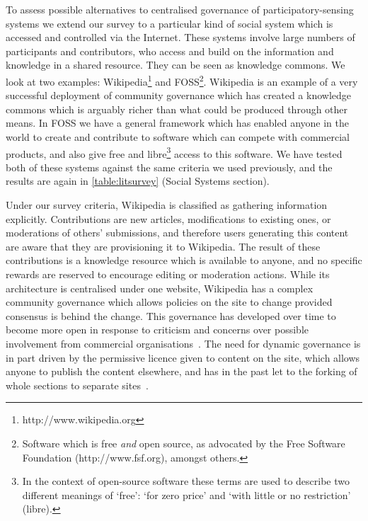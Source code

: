 To assess possible alternatives to centralised governance of participatory-sensing systems we extend our survey to a particular kind of social system which is accessed and controlled via the Internet. 
These systems involve large numbers of participants and contributors, who access and build on the information and knowledge in a shared resource. They can be seen as knowledge commons. We look at two examples: Wikipedia\footnote{http://www.wikipedia.org} and \ac{FOSS}\footnote{Software which is free \emph{and} open source, as advocated by the Free Software Foundation (http://www.fsf.org), amongst others.}. Wikipedia is an example of a very successful deployment of community governance which has created a knowledge commons which is arguably richer than what could be produced through other means. 
In \ac{FOSS} we have a general framework which has enabled anyone in the world to create and contribute to software which can compete with commercial products, and also give free and libre\footnote{In the context of open-source software these terms are used to describe two different meanings of `free': `for zero price' and `with little or no restriction' (libre).} access to this software. 
We have tested both of these systems against the same criteria we used previously, and the results are again in \autoref{table:litsurvey} (Social Systems section).

Under our survey criteria, Wikipedia is classified as gathering information explicitly. Contributions are new articles, modifications to existing ones, or moderations of others' submissions, and therefore users generating this content are aware that they are provisioning it to Wikipedia. The result of these contributions is a knowledge resource which is available to anyone, and no specific rewards are reserved to encourage editing or moderation actions. While its architecture is centralised under one website, Wikipedia has a complex community governance which allows policies on the site to change provided consensus is behind the change. This governance has developed over time to become more open in response to criticism and concerns over possible involvement from commercial organisations~\citep{MayoFusterMorell2011}. The need for dynamic governance is in part driven by the permissive licence given to content on the site, which allows anyone to publish the content elsewhere, and has in the past let to the forking of whole sections to separate sites~\citep{Famiglietti2011}.

